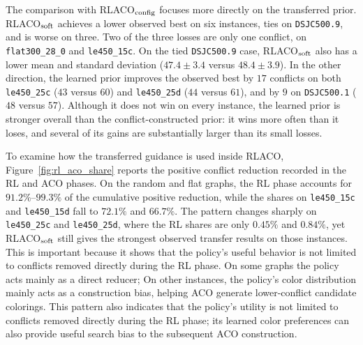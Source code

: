 The comparison with RLACO$_{\rm config}$ focuses more directly on the transferred prior. RLACO$_{\rm soft}$ achieves a lower observed best on six instances, ties on \texttt{DSJC500.9}, and is worse on three. Two of the three losses are only one conflict, on \texttt{flat300\_28\_0} and \texttt{le450\_15c}. On the tied \texttt{DSJC500.9} case, RLACO$_{\rm soft}$ also has a lower mean and standard deviation ($47.4\pm3.4$ versus $48.4\pm3.9$). In the other direction, the learned prior improves the observed best by $17$ conflicts on both \texttt{le450\_25c} ($43$ versus $60$) and \texttt{le450\_25d} ($44$ versus $61$), and by $9$ on \texttt{DSJC500.1} ($48$ versus $57$). Although it does not win on every instance, the learned prior is stronger overall than the conflict-constructed prior: it wins more often than it loses, and several of its gains are substantially larger than its small losses.

\begin{table}[t]
\centering
\caption{Transfer comparison at fixed tested $k$. Entries are best conflicts (mean$\pm$sample standard deviation); the lowest best value per row is bold, including ties. All cells contain ten complete runs. RLACO$_0$ is the random-policy transfer reference defined in Section~\ref{ssec:rlaco}. Welch $t$ uses RLACO$_0$ minus RLACO$_{\rm soft}$, with ten runs per group; two-sided $p$-values are Holm-adjusted across ten instances.}
\label{tab:rlaco-config}
\setlength{\tabcolsep}{3pt}
\resizebox{\textwidth}{!}{}
\end{table}

To examine how the transferred guidance is used inside RLACO, Figure~\ref{fig:rl_aco_share} reports the positive conflict reduction recorded in the RL and ACO phases. On the random and flat graphs, the RL phase accounts for $91.2\%$--$99.3\%$ of the cumulative positive reduction, while the shares on \texttt{le450\_15c} and \texttt{le450\_15d} fall to $72.1\%$ and $66.7\%$. The pattern changes sharply on \texttt{le450\_25c} and \texttt{le450\_25d}, where the RL shares are only $0.45\%$ and $0.84\%$, yet RLACO$_{\rm soft}$ still gives the strongest observed transfer results on those instances. This is important because it shows that the policy's useful behavior is not limited to conflicts removed directly during the RL phase. On some graphs the policy acts mainly as a direct reducer; On other instances, the policy's color distribution mainly acts as a construction bias, helping ACO generate lower-conflict candidate colorings. This pattern also indicates that the policy's utility is not limited to conflicts
removed directly during the RL phase; its learned color preferences can also
provide useful search bias to the subsequent ACO construction.

